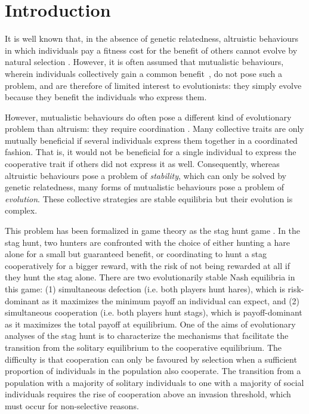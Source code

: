 \section{Introduction}
\label{intro}
  It is well known that, in the absence of genetic relatedness, altruistic behaviours in which individuals pay a fitness cost for the benefit of others cannot evolve by natural selection \parencite{Hamilton1964,West2007a}. However, it is often assumed that mutualistic behaviours, wherein individuals collectively gain a common benefit~\parencite{Leimar2003, Leimar2010}, do not pose such a problem, and are therefore of limited interest to evolutionists: they simply evolve because they benefit the individuals who express them.

  However, mutualistic behaviours do often pose a different kind of evolutionary problem than altruism: they require coordination \parencite{Alvard2002, Alvard2003, Drea2009a, Leimar2003}. Many collective traits are only mutually beneficial if several individuals express them together in a coordinated fashion. That is, it would not be beneficial for a single individual to express the cooperative trait if others did not express it as well. Consequently, whereas altruistic behaviours pose a problem of \textit{stability}, which can only be solved by genetic relatedness, many forms of mutualistic behaviours pose a problem of \textit{evolution}. These collective strategies are stable equilibria but their evolution is complex. 

  This problem has been formalized in game theory as the stag hunt game \parencite{Skyrms2004}. In the stag hunt, two hunters are confronted with the choice of either hunting a hare alone for a small but guaranteed benefit, or coordinating to hunt a stag cooperatively for a bigger reward, with the risk of not being rewarded at all if they hunt the stag alone. There are two evolutionarily stable Nash equilibria in this game: (1) simultaneous defection (i.e. both players hunt hares), which is risk-dominant as it maximizes the minimum payoff an individual can expect, and (2) simultaneous cooperation (i.e. both players hunt stags), which is payoff-dominant as it maximizes the total payoff at equilibrium. One of the aims of evolutionary analyses of the stag hunt is to characterize the mechanisms that facilitate the transition from the solitary equilibrium to the cooperative equilibrium. The difficulty is that cooperation can only be favoured by selection when a sufficient proportion of individuals in the population also cooperate. The transition from a population with a majority of solitary individuals to one with a majority of social individuals requires the rise of cooperation above an invasion threshold, which must occur for non-selective reasons.

